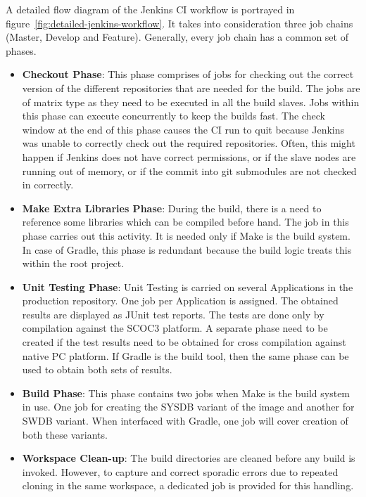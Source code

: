 \documentclass[12pt, a4paper, titlepage]{scrartcl}
\begin{document}
\par A detailed flow diagram of the Jenkins CI workflow is portrayed in figure~\ref{fig:detailed-jenkins-workflow}. It takes into consideration three job chains (Master, Develop and Feature). Generally, every job chain has a common set of phases. 
\begin{itemize}
\item \textbf{Checkout Phase}: This phase comprises of jobs for checking out the correct version of the different repositories that are needed for the build. The jobs are of matrix type as they need to be executed in all the build slaves. Jobs within this phase can execute concurrently to keep the builds fast. The check window at the end of this phase causes the CI run to quit because Jenkins was unable to correctly check out the required repositories. Often, this might happen if Jenkins does not have correct permissions, or if the slave nodes are running out of memory, or if the commit into git submodules are not checked in correctly. 
\item \textbf{Make Extra Libraries Phase}: During the build, there is a need to reference some libraries which can be compiled before hand. The job in this phase carries out this activity. It is needed only if Make is the build system. In case of Gradle, this phase is redundant because the build logic treats this within the root project. 
\item \textbf{Unit Testing Phase}: Unit Testing is carried on several Applications in the production repository. One job per Application is assigned. The obtained results are displayed as JUnit test reports. The tests are done only by compilation against the SCOC3 platform. A separate phase need to be created if the test results need to be obtained for cross compilation against native PC platform. If Gradle is the build tool, then the same phase can be used to obtain both sets of results. 
\item \textbf{Build Phase}: This phase contains two jobs when Make is the build system in use. One job for creating the SYSDB variant of the image and another for SWDB variant. When interfaced with Gradle, one job will cover creation of both these variants. 
\item \textbf{Workspace Clean-up}: The build directories are cleaned before any build is invoked. However, to capture and correct sporadic errors due to repeated cloning in the same workspace, a dedicated job is provided for this handling. 
\end{itemize}
\end{document}
